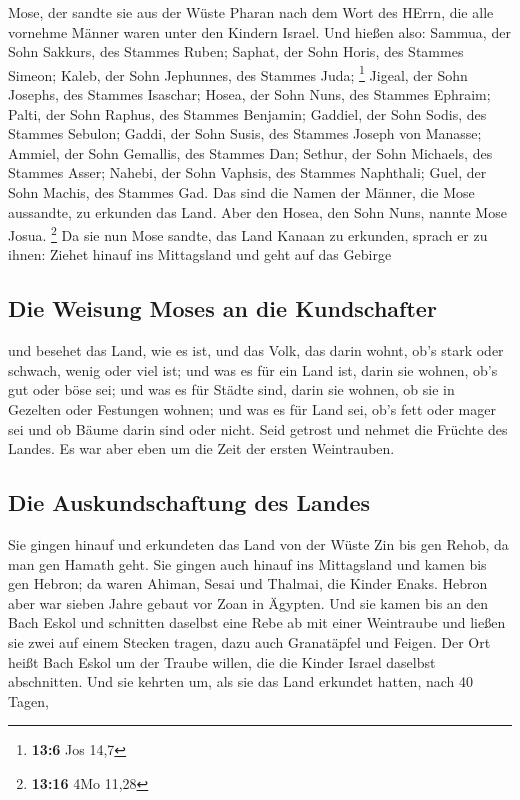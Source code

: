  Mose, der sandte sie aus der Wüste Pharan nach dem Wort
des HErrn, die alle vornehme Männer waren unter den Kindern Israel.
 Und hießen also: Sammua, der Sohn Sakkurs, des Stammes
Ruben;  Saphat, der Sohn Horis, des Stammes Simeon;
 Kaleb, der Sohn Jephunnes, des Stammes Juda; \footnote{\textbf{13:6}
  Jos 14,7}  Jigeal, der Sohn Josephs, des Stammes
Isaschar;  Hosea, der Sohn Nuns, des Stammes Ephraim;
 Palti, der Sohn Raphus, des Stammes Benjamin;
 Gaddiel, der Sohn Sodis, des Stammes Sebulon;
 Gaddi, der Sohn Susis, des Stammes Joseph von Manasse;
 Ammiel, der Sohn Gemallis, des Stammes Dan;
 Sethur, der Sohn Michaels, des Stammes Asser;
 Nahebi, der Sohn Vaphsis, des Stammes Naphthali;
 Guel, der Sohn Machis, des Stammes Gad. 
Das sind die Namen der Männer, die Mose aussandte, zu erkunden das Land.
Aber den Hosea, den Sohn Nuns, nannte Mose Josua. \footnote{\textbf{13:16}
  4Mo 11,28}  Da sie nun Mose sandte, das Land Kanaan zu
erkunden, sprach er zu ihnen: Ziehet hinauf ins Mittagsland und geht auf
das Gebirge

\hypertarget{die-weisung-moses-an-die-kundschafter}{%
\subsection{Die Weisung Moses an die
Kundschafter}\label{die-weisung-moses-an-die-kundschafter}}

 und besehet das Land, wie es ist, und das Volk, das
darin wohnt, ob's stark oder schwach, wenig oder viel ist;
 und was es für ein Land ist, darin sie wohnen, ob's gut
oder böse sei; und was es für Städte sind, darin sie wohnen, ob sie in
Gezelten oder Festungen wohnen;  und was es für Land sei,
ob's fett oder mager sei und ob Bäume darin sind oder nicht. Seid
getrost und nehmet die Früchte des Landes. Es war aber eben um die Zeit
der ersten Weintrauben.

\hypertarget{die-auskundschaftung-des-landes}{%
\subsection{Die Auskundschaftung des
Landes}\label{die-auskundschaftung-des-landes}}

 Sie gingen hinauf und erkundeten das Land von der Wüste
Zin bis gen Rehob, da man gen Hamath geht.  Sie gingen
auch hinauf ins Mittagsland und kamen bis gen Hebron; da waren Ahiman,
Sesai und Thalmai, die Kinder Enaks. Hebron aber war sieben Jahre gebaut
vor Zoan in Ägypten.  Und sie kamen bis an den Bach Eskol
und schnitten daselbst eine Rebe ab mit einer Weintraube und ließen sie
zwei auf einem Stecken tragen, dazu auch Granatäpfel und Feigen.
 Der Ort heißt Bach Eskol um der Traube willen, die die
Kinder Israel daselbst abschnitten.  Und sie kehrten um,
als sie das Land erkundet hatten, nach 40 Tagen,

